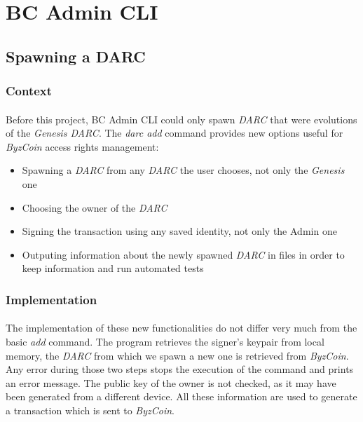 \section{BC Admin CLI}
\label{section4}

\subsection{Spawning a DARC}

\subsubsection{Context}

\paragraph{}

Before this project, BC Admin CLI could only spawn \textit{DARC} that were evolutions of the \textit{Genesis DARC}. The \textit{darc add} command provides new options useful for \textit{ByzCoin} access rights management:

\begin{itemize}
    \item Spawning a \textit{DARC} from any \textit{DARC} the user chooses, not only the \textit{Genesis} one
    \item Choosing the owner of the \textit{DARC}
    \item Signing the transaction using any saved identity, not only the Admin one
    \item Outputing information about the newly spawned \textit{DARC} in files in order to keep information and run automated tests
\end{itemize}

\subsubsection{Implementation}

\paragraph{}

The implementation of these new functionalities do not differ very much from the basic \textit{add} command. The program retrieves the signer's keypair from local memory, the \textit{DARC} from which we spawn a new one is retrieved from \textit{ByzCoin}. Any error during those two steps stops the execution of the command and prints an error message. The public key of the owner is not checked, as it may have been generated from a different device. All these information are used to generate a transaction which is sent to \textit{ByzCoin}.

